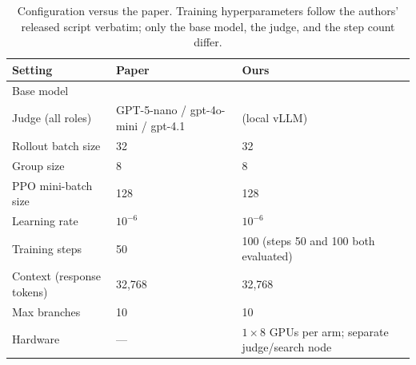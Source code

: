 \begin{table}[t]
\centering
\small
\begin{tabular}{lll}
\toprule
Setting & Paper & Ours \\
\midrule
Base model & \seedoss{} & \qwen{} \\
Judge (all roles) & GPT-5-nano / gpt-4o-mini / gpt-4.1 & \judgemodel{} (local vLLM) \\
Rollout batch size & 32 & 32 \\
Group size & 8 & 8 \\
PPO mini-batch size & 128 & 128 \\
Learning rate & $10^{-6}$ & $10^{-6}$ \\
Training steps & 50 & 100 (steps 50 and 100 both evaluated) \\
Context (response tokens) & 32{,}768 & 32{,}768 \\
Max branches & 10 & 10 \\
Hardware & --- & $1 \times 8$ GPUs per arm; separate judge/search node \\
\bottomrule
\end{tabular}
\caption{Configuration versus the paper. Training hyperparameters follow the authors' released
script verbatim; only the base model, the judge, and the step count differ.}
\label{tab:config}
\end{table}

